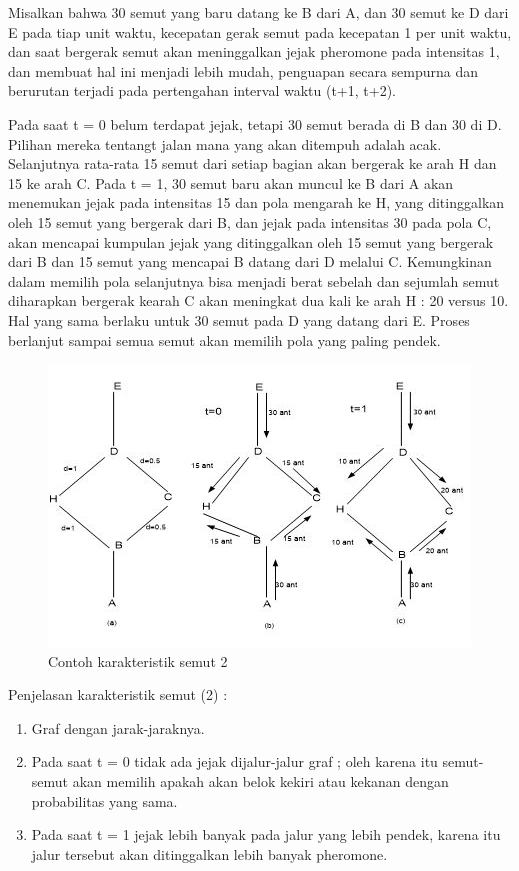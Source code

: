 \documentclass[a4paper,twoside]{article}
\begin{document}
\begin{enumerate}
\begin{itemize}
\begin{enumerate}
			Misalkan bahwa 30 semut yang baru datang ke B dari A, dan 30 semut ke D dari E pada tiap unit waktu, kecepatan gerak semut pada kecepatan 1 per unit waktu, dan saat bergerak semut akan meninggalkan jejak pheromone pada intensitas 1, dan membuat hal ini menjadi lebih mudah, penguapan secara sempurna dan berurutan terjadi pada pertengahan interval waktu (t+1, t+2).
			
			Pada saat t = 0 belum terdapat jejak, tetapi 30 semut berada di B dan 30 di D. Pilihan mereka tentangt jalan mana yang akan ditempuh adalah acak. Selanjutnya rata-rata 15 semut dari setiap bagian akan bergerak ke arah H dan 15 ke arah C.
			Pada t = 1, 30 semut baru akan muncul ke B dari A akan menemukan jejak pada intensitas 15 dan pola mengarah ke H, yang ditinggalkan oleh 15 semut yang bergerak dari B, dan jejak pada intensitas 30 pada pola C, akan mencapai kumpulan jejak yang ditinggalkan oleh 15 semut yang bergerak dari B dan 15 semut yang mencapai B datang dari D melalui C. Kemungkinan dalam memilih pola selanjutnya bisa menjadi berat sebelah dan sejumlah semut diharapkan bergerak kearah C akan meningkat dua kali ke arah H : 20 versus 10. Hal yang sama berlaku untuk 30 semut pada D yang datang dari E.
			Proses berlanjut sampai semua semut akan memilih pola yang paling pendek. 
			\begin{figure}[H]
				\centering
				\includegraphics[scale=0.85]{gambar6}
				\caption[Contoh Karakteristik Semut] {Contoh karakteristik semut 2}
				\label{fig:karakteristiksemut2}
			\end{figure}
		
			Penjelasan karakteristik semut (2) :
			\begin{enumerate}
			 \item Graf dengan jarak-jaraknya.
			 \item Pada saat t = 0 tidak ada jejak dijalur-jalur graf ; oleh karena itu semut-semut akan memilih apakah akan belok kekiri atau kekanan dengan probabilitas yang sama.
			 \item Pada saat t = 1 jejak lebih banyak pada jalur yang lebih pendek, karena itu jalur tersebut akan ditinggalkan lebih banyak pheromone.\\
			 

\end{enumerate}
\end{enumerate}
\end{itemize}
\end{enumerate}
\end{document}
